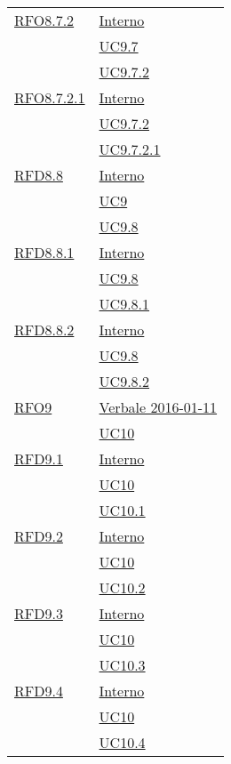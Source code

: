 \begin{longtable}{|>{\centering}m{5cm}|m{5cm}<{\centering}|}
\hyperlink{RFO8.7.2}{RFO8.7.2} & \hyperlink{Interno}{Interno}\\
& \hyperref[UC9.7]{UC9.7}\\
& \hyperref[UC9.7.2]{UC9.7.2}\\ \hline

\hyperlink{RFO8.7.2.1}{RFO8.7.2.1} & \hyperlink{Interno}{Interno}\\
& \hyperref[UC9.7.2]{UC9.7.2}\\
& \hyperref[UC9.7.2.1]{UC9.7.2.1}\\ \hline

\hyperlink{RFD8.8}{RFD8.8} & \hyperlink{Interno}{Interno}\\
& \hyperref[UC9]{UC9}\\
& \hyperref[UC9.8]{UC9.8}\\ \hline

\hyperlink{RFD8.8.1}{RFD8.8.1} & \hyperlink{Interno}{Interno}\\
& \hyperref[UC9.8]{UC9.8}\\
& \hyperref[UC9.8.1]{UC9.8.1}\\ \hline

\hyperlink{RFD8.8.2}{RFD8.8.2} & \hyperlink{Interno}{Interno}\\
& \hyperref[UC9.8]{UC9.8}\\
& \hyperref[UC9.8.2]{UC9.8.2}\\ \hline

\hyperlink{RFO9}{RFO9} & \hyperlink{Verbale 2016-01-11}{Verbale 2016-01-11}\\
& \hyperref[UC10]{UC10}\\ \hline

\hyperlink{RFD9.1}{RFD9.1} & \hyperlink{Interno}{Interno}\\
& \hyperref[UC10]{UC10}\\
& \hyperref[UC10.1]{UC10.1}\\ \hline

\hyperlink{RFD9.2}{RFD9.2} & \hyperlink{Interno}{Interno}\\
& \hyperref[UC10]{UC10}\\
& \hyperref[UC10.2]{UC10.2}\\ \hline

\hyperlink{RFD9.3}{RFD9.3} & \hyperlink{Interno}{Interno}\\
& \hyperref[UC10]{UC10}\\
& \hyperref[UC10.3]{UC10.3}\\ \hline

\hyperlink{RFD9.4}{RFD9.4} & \hyperlink{Interno}{Interno}\\
& \hyperref[UC10]{UC10}\\
& \hyperref[UC10.4]{UC10.4}\\ \hline


\end{longtable}
